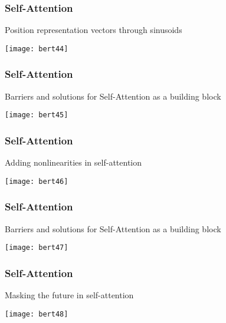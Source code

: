 \begin{frame}[fragile]\frametitle{Self-Attention}

Position representation vectors through sinusoids

\begin{center}
\texttt{[image: bert44]}
\end{center}	

 
\end{frame}

\begin{frame}[fragile]\frametitle{Self-Attention}

Barriers and solutions for Self-Attention as a building block

\begin{center}
\texttt{[image: bert45]}
\end{center}	

 
\end{frame}

\begin{frame}[fragile]\frametitle{Self-Attention}

Adding nonlinearities in self-attention

\begin{center}
\texttt{[image: bert46]}
\end{center}	

 
\end{frame}

\begin{frame}[fragile]\frametitle{Self-Attention}

Barriers and solutions for Self-Attention as a building block

\begin{center}
\texttt{[image: bert47]}
\end{center}	

 
\end{frame}


\begin{frame}[fragile]\frametitle{Self-Attention}

Masking the future in self-attention

\begin{center}
\texttt{[image: bert48]}
\end{center}	

 
\end{frame}

